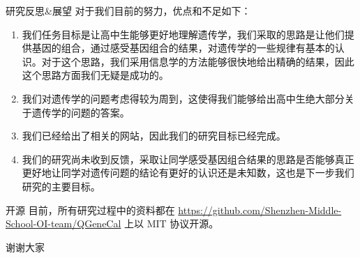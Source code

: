 \documentclass{beamer}
\begin{document}
	\begin{frame}{研究反思\&展望}
		对于我们目前的努力，优点和不足如下：
		\begin{enumerate}
			\item 我们任务目标是让高中生能够更好地理解遗传学，我们采取的思路是让他们提供基因的组合，通过感受基因组合的结果，对遗传学的一些规律有基本的认识。对于这个思路，我们采用信息学的方法能够很快地给出精确的结果，因此这个思路方面我们无疑是成功的。
			\item 我们对遗传学的问题考虑得较为周到，这使得我们能够给出高中生绝大部分关于遗传学的问题的答案。
			\item 我们已经给出了相关的网站，因此我们的研究目标已经完成。
			\item 我们的研究尚未收到反馈，采取让同学感受基因组合结果的思路是否能够真正更好地让同学对遗传问题的结论有更好的认识还是未知数，这也是下一步我们研究的主要目标。
		\end{enumerate}
	\end{frame}

	\begin{frame}{开源}
		目前，所有研究过程中的资料都在 \href{https://github.com/Shenzhen-Middle-School-OI-team/QGeneCal}{https://github.com/Shenzhen-Middle-School-OI-team/QGeneCal} 上以 MIT 协议开源。
	\end{frame}

	\begin{frame}{}
		\centering \huge 谢谢大家
	\end{frame}
\end{document}
